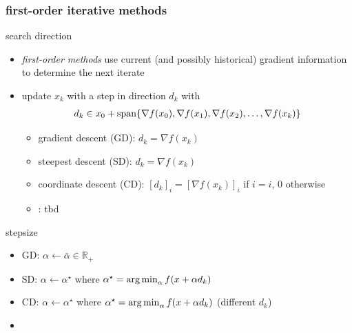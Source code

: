 \documentclass[10pt,dvipsnames*]{beamer}
\begin{document}
\begin{frame}
  \frametitle{first-order iterative methods}
  \begin{block}{search direction}
    \begin{itemize}
      \item \textit{first-order methods} use current (and possibly historical) gradient information to determine the next iterate
      \item update $x_k$ with a step in direction $d_k$ with
      \begin{align}
        d_k \in x_0 + \operatorname{span} \{\nabla f(x_0), \nabla f(x_1), \nabla f(x_2), \ldots, \nabla f(x_{k})\}
      \end{align}
      \vspace{-0.15cm}
      \begin{itemize}
        \item gradient descent (GD): $d_k = \nabla f(x_k)$
        \item steepest descent (SD): $d_k = \nabla f(x_k)$
        \item coordinate descent (CD): $[d_k]_{i} = [\nabla f(x_k)]_{i}$ if $i = \hat{i}$, 0 otherwise
        \item {}: tbd
      \end{itemize}
    \end{itemize}
  \end{block}
  \begin{block}{stepsize}
    \begin{itemize}
      \item GD: $\alpha \gets \bar{\alpha} \in \mathbb{R}_+$
      \item SD: $\alpha \gets \alpha^{\star}$ where $\alpha^{\star} = \operatorname*{arg\,min}_{\alpha} f(x + \alpha d_k)$
      \item CD: $\alpha \gets \alpha^{\star}$ where $\alpha^{\star} = \operatorname*{arg\,min}_{\alpha} f(x + \alpha d_k)$ (different $d_k$)
      \item {}
    \end{itemize}
  \end{block}
\end{frame}
%
\end{document}
